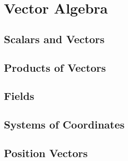 \section{Vector Algebra}

\subsection{Scalars and Vectors}

\subsection{Products of Vectors}

\subsection{Fields}

\subsection{Systems of Coordinates}

\subsection{Position Vectors}
